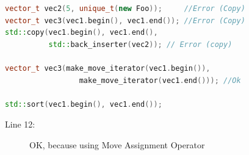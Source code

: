 \documentclass[a4paper,11pt,twoside]{book}
\begin{document}
\begin{itemize}
\begin{lstlisting}[frame=single, language=c++]
vector_t vec2(5, unique_t(new Foo));     //Error (Copy)
vector_t vec3(vec1.begin(), vec1.end()); //Error (Copy)
std::copy(vec1.begin(), vec1.end(),
          std::back_inserter(vec2)); // Error (copy)

vector_t vec3(make_move_iterator(vec1.begin()),
                 make_move_iterator(vec1.end())); //Ok

std::sort(vec1.begin(), vec1.end());
\end{lstlisting}
\begin{description}
	\item[Line 12:] OK, because using Move Assignment Operator
\end{description}

\end{itemize}
\end{document}

